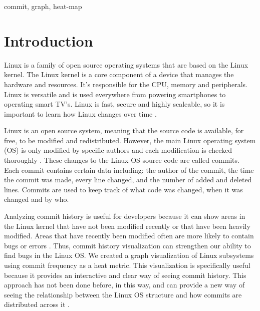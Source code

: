 \documentclass[conference]{IEEEtran}
\begin{document}
\begin{IEEEkeywords}
commit, graph, heat-map
\end{IEEEkeywords}

\section{Introduction}
\label{intro}
Linux is a family of open source operating systems that are based on the Linux kernel. The Linux kernel is a core component of a device that manages the hardware and resources. It's responsible for the CPU, memory and peripherals. Linux is versatile and is used everywhere from powering smartphones to operating smart TV's. Linux is fast, secure and highly scaleable, so it is important to learn how Linux changes over time \cite{love2010linux}.%

Linux is an open source system, meaning that the source code is available, for free, to be modified and redistributed. However, the main Linux operating system (OS) is only modified by specific authors and each modification is checked thoroughly \cite{ISRAELI}. These changes to the Linux OS source code are called commits. Each commit contains certain data including: the author of the commit, the time the commit was made, every line changed, and the number of added and deleted lines. Commits are used to keep track of what code was changed, when it was changed and by who. %



Analyzing commit history is useful for developers because it can show areas in the Linux kernel that have not been modified recently or that have been heavily modified. Areas that have recently been modified often are more likely to contain bugs or errors \cite{pradel}. Thus, commit history visualization can strengthen our ability to find bugs in the Linux OS. We created a graph visualization of Linux subsystems using commit frequency as a heat metric. This visualization is specifically useful because it provides an interactive and clear way of seeing commit history. This approach has not been done before, in this way, and can provide a new way of seeing the relationship between the Linux OS structure and how commits are distributed across it \cite{peru}. %
\end{document}
